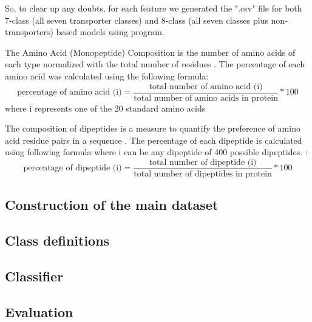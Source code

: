     So, to clear up any doubts, for each feature we generated the ".csv" file for both 7-class (all seven transporter classes) and 8-class 
    (all seven classes plus non-transporters) based models using  program.
    
    
    The Amino Acid (Monopeptide) Composition is the number of amino acids of each type normalized with the total number of 
    residues \cite{gromiha2010protein}. The percentage of each amino acid was calculated using the following formula:
    \begin{equation}
        \text{percentage of amino acid (i)} = \frac {\text{total number of amino acid (i)}} {\text{total number of amino acids in protein}} * 100
    \end{equation}
    where i represents one of the 20 standard amino acids \cite{mishra2014prediction} 
    
    The composition of dipeptides is a measure to quantify the preference of amino acid residue pairs in a sequence 
    \cite{gromiha2010protein}. The percentage of each dipeptide is calculated using following formula where i 
    can be any dipeptide of 400 possible dipeptides. \cite{mishra2014prediction}:
    \begin{equation}
        \text{percentage of dipeptide (i)} = \frac {\text{total number of dipeptide (i)}} {\text{total number of dipeptides in protein}} * 100
    \end{equation}

    \subsection{Construction of the main dataset}

    \subsection{Class definitions}

    \subsection{Classifier}

    \subsection{Evaluation}
